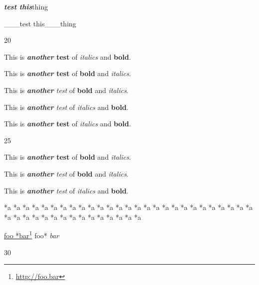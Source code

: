 \textbf{\emph{test this}}thing

\_\_\_test this\_\_\_thing

20

This is \textbf{\emph{another} test} of \emph{italics} and \textbf{bold}.

This is \textbf{\emph{another} test} of \textbf{bold} and \emph{italics}.

This is \emph{\textbf{another} test} of \textbf{bold} and \emph{italics}.

This is \emph{\textbf{another} test} of \emph{italics} and \textbf{bold}.

This is \textbf{\emph{another} test} of \emph{italics} and \textbf{bold}.

25

This is \textbf{\emph{another} test} of \textbf{bold} and \emph{italics}.

This is \emph{\textbf{another} test} of \textbf{bold} and \emph{italics}.

This is \emph{\textbf{another} test} of \emph{italics} and \textbf{bold}.

*a *a *a *a *a *a *a *a *a *a *a *a *a *a *a *a *a *a *a *a *a *a *a *a *a *a *a *a *a *a *a *a *a *a *a *a *a *a *a *a *a *a

\href{http://foo.bar}{foo *bar}\footnote{\href{http://foo.bar}{http:\slash \slash foo.bar}} foo* \emph{bar}

30
